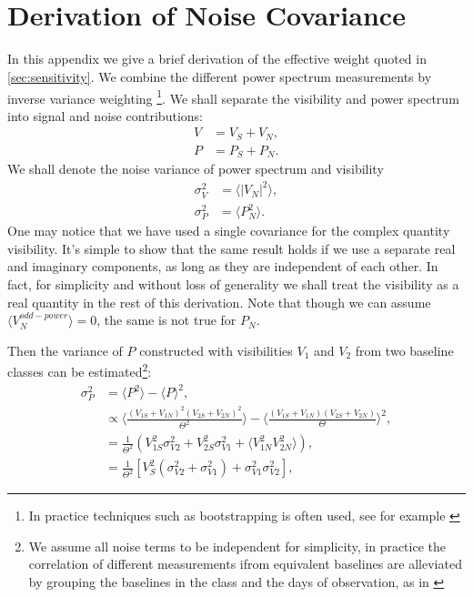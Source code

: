 \documentclass[twocolumn,apj,numberedappendix]{emulateapj}
\renewcommand\[{\begin{equation}}
\renewcommand\]{\end{equation}}
\begin{document}
\pagebreak



\appendix
\section{\label{sec:appB}\\Derivation of Noise Covariance \label{sec:appB}}
\label{sec:appB}
In this appendix we give a brief derivation of the effective weight quoted in \ref{sec:sensitivity}. We combine the different power spectrum measurements by inverse variance weighting \footnote{In practice techniques such as bootstrapping is often used, see for example \citep{Ali2015}}. We shall separate the visibility and power spectrum into signal and noise contributions:
\begin{equation}
\begin{aligned}
V &= V_S+V_N,\\
P &= P_S+P_N.
\end{aligned}
\end{equation}
We shall denote the noise variance of power spectrum and visibility
\begin{equation}
\begin{aligned}
\sigma_V^2 &= \langle |V_N|^2 \rangle,\\
\sigma_P^2 &= \langle P_N^2 \rangle.
\end{aligned}
\end{equation}
One may notice that we have used a single covariance for the complex quantity visibility. It's simple to show that the same result holds if we use a separate real and imaginary components, as long as they are independent of each other. In fact, for simplicity and without loss of generality we shall treat the visibility as a real quantity in the rest of this derivation. 
Note that though we can assume $\langle V_N^{odd-power}\rangle=0$, the same is not true for $P_N$. 

Then the variance of $P$ constructed with visibilities $V_1$ and $V_2$ from two baseline classes can be estimated\footnote{We assume all noise terms to be independent for simplicity, in practice the correlation of different measurements ifrom equivalent baselines are alleviated by grouping the baselines in the class and the days of observation, as in \cite{Ali2015}}:
\begin{equation}
\begin{aligned}
\sigma_P^2 &= \langle P^2\rangle -\langle P \rangle^2,\\
&\propto \langle \frac{(V_{1S}+V_{1N})^2 (V_{2S}+V_{2N})^2}{\Theta^2} \rangle - \langle \frac{(V_{1S}+V_{1N}) (V_{2S}+V_{2N})}{\Theta} \rangle ^2,\\
&= \frac{1}{\Theta^2} \left( V_{1S}^2\sigma_{V2}^2+V_{2S}^2\sigma_{V1}^2+\langle V_{1N}^2 V_{2N}^2\rangle\right), \\
&= \frac{1}{\Theta^2} \left[ V_{S}^2(\sigma_{V2}^2+\sigma_{V1}^2) + \sigma_{V1}^2 \sigma_{V2}^2\right], 
\end{aligned}
\end{equation}
\end{document}
